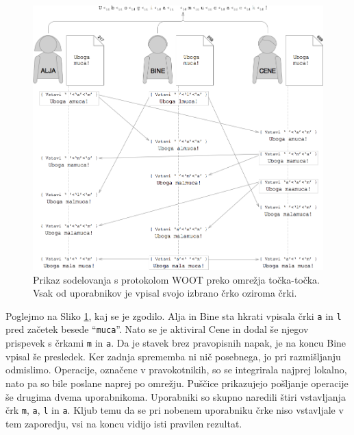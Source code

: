 \documentclass[a4paper, 12pt, twoside]{book}
\begin{document}
\begin{figure}[placement h]
\begin{center}
\includegraphics[width=13cm]{woot6.png}
\end{center}
\caption{Prikaz sodelovanja s protokolom WOOT preko omrežja točka-točka. Vsak od uporabnikov je vpisal svojo izbrano črko oziroma črki.}
\label{woot6}
\end{figure}

Poglejmo na Sliko \ref{woot6}, kaj se je zgodilo. Alja in Bine sta hkrati vpisala črki {\tt a} in {\tt l} pred začetek besede “{\tt muca}”. Nato se je aktiviral Cene in dodal še njegov prispevek s črkami {\tt m} in {\tt a}. Da je stavek brez pravopisnih napak, je na koncu Bine vpisal še presledek. Ker zadnja sprememba ni nič posebnega, jo pri razmišljanju odmislimo. Operacije, označene v pravokotnikih, so se integrirala najprej lokalno, nato pa so bile poslane naprej po omrežju. Puščice prikazujejo pošljanje operacije še drugima dvema uporabnikoma. Uporabniki so skupno naredili štiri vstavljanja črk {\tt m}, {\tt a}, {\tt l} in {\tt a}. Kljub temu da se pri nobenem uporabniku črke niso vstavljale v tem zaporedju, vsi na koncu vidijo isti pravilen rezultat.
\end{document}
